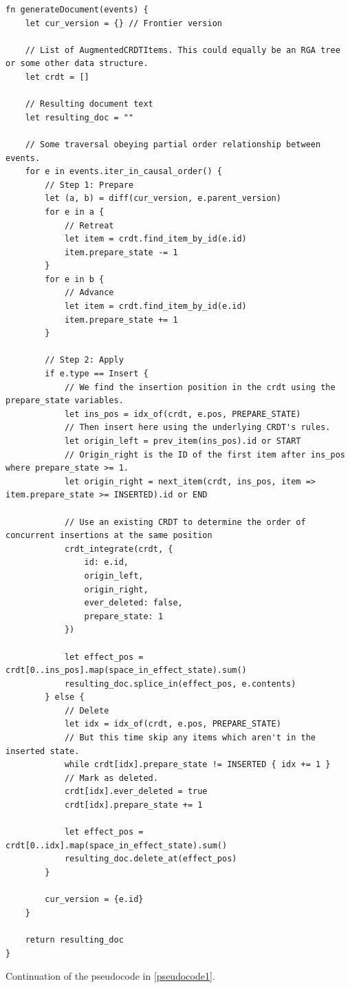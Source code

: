 \documentclass[sigplan,10pt]{acmart}
\begin{document}
\begin{listing*}
\footnotesize
\begin{verbatim}
fn generateDocument(events) {
    let cur_version = {} // Frontier version

    // List of AugmentedCRDTItems. This could equally be an RGA tree or some other data structure.
    let crdt = []

    // Resulting document text
    let resulting_doc = ""

    // Some traversal obeying partial order relationship between events.
    for e in events.iter_in_causal_order() {
        // Step 1: Prepare
        let (a, b) = diff(cur_version, e.parent_version)
        for e in a {
            // Retreat
            let item = crdt.find_item_by_id(e.id)
            item.prepare_state -= 1
        }
        for e in b {
            // Advance
            let item = crdt.find_item_by_id(e.id)
            item.prepare_state += 1
        }

        // Step 2: Apply
        if e.type == Insert {
            // We find the insertion position in the crdt using the prepare_state variables.
            let ins_pos = idx_of(crdt, e.pos, PREPARE_STATE)
            // Then insert here using the underlying CRDT's rules.
            let origin_left = prev_item(ins_pos).id or START
            // Origin_right is the ID of the first item after ins_pos where prepare_state >= 1.
            let origin_right = next_item(crdt, ins_pos, item => item.prepare_state >= INSERTED).id or END

            // Use an existing CRDT to determine the order of concurrent insertions at the same position
            crdt_integrate(crdt, {
                id: e.id,
                origin_left,
                origin_right,
                ever_deleted: false,
                prepare_state: 1
            })

            let effect_pos = crdt[0..ins_pos].map(space_in_effect_state).sum()
            resulting_doc.splice_in(effect_pos, e.contents)
        } else {
            // Delete
            let idx = idx_of(crdt, e.pos, PREPARE_STATE)
            // But this time skip any items which aren't in the inserted state.
            while crdt[idx].prepare_state != INSERTED { idx += 1 }
            // Mark as deleted.
            crdt[idx].ever_deleted = true
            crdt[idx].prepare_state += 1

            let effect_pos = crdt[0..idx].map(space_in_effect_state).sum()
            resulting_doc.delete_at(effect_pos)
        }

        cur_version = {e.id}
    }

    return resulting_doc
}
\end{verbatim}
\caption{Continuation of the pseudocode in \autoref{pseudocode1}.}\label{pseudocode2}
\end{listing*}
\end{document}
